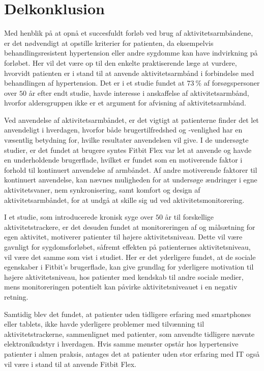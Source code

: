 \section{Delkonklusion}

Med henblik på at opnå et succesfuldt forløb ved brug af aktivitetsarmbåndene, er det nødvendigt at opstille kriterier for patienten, da eksempelvis behandlingsresistent hypertension eller andre sygdomme kan have indvirkning på forløbet. Her vil det være op til den enkelte praktiserende læge at vurdere, hvorvidt patienten er i stand til at anvende aktivitetsarmbånd i forbindelse med behandlingen af hypertension. Det er i et studie fundet at $73~\%$ af forsøgspersoner over $50$ år efter endt studie, havde interesse i anskaffelse af aktivitetsarmbånd, hvorfor aldersgruppen ikke er et argument for afvisning af aktivitetsarmbånd.

Ved anvendelse af aktivitetsarmbåndet, er det vigtigt at patienterne finder det let anvendeligt i hverdagen, hvorfor både brugertilfredshed og -venlighed har en væsentlig betydning for, hvilke resultater anvendelsen vil give. I de undersøgte studier, er det fundet at brugere syntes Fitbit Flex var let at anvende og havde en underholdende brugerflade, hvilket er fundet som en motiverende faktor i forhold til kontinuert anvendelse af armbåndet. Af andre motiverende faktorer til kontinuert anvendelse, kan nævnes muligheden for at undersøge ændringer i egne aktivitetsvaner, nem synkronisering, samt komfort og design af aktivitetsarmbåndet, for at undgå at skille sig ud ved aktivitetsmonitorering.

I et studie, som introducerede kronisk syge over $50$ år til forskellige aktivitetstrackere, er det desuden fundet at monitoreringen af og målsætning for egen aktivitet, motiverer patienter til højere aktivitetsniveau. Dette vil være gavnligt for sygdomsforløbet, såfremt effekten på patienternes aktivitetsniveau, vil være det samme som vist i studiet. Her er det yderligere fundet, at de sociale egenskaber i Fitbit's brugerflade, kan give grundlag for yderligere motivation til højere aktivitetsniveau, hos patienter med kendskab til andre sociale medier, mens monitoreringen potentielt kan påvirke aktivitetsniveauet i en negativ retning.

Samtidig blev det fundet, at patienter uden tidligere erfaring med smartphones eller tablets, ikke havde yderligere problemer med tilvænning til aktivitetstrackerne, sammenlignet med patienter, som anvendte tidligere nævnte elektronikudstyr i hverdagen. Hvis samme mønster opstår hos hypertensive patienter i almen praksis, antages det at patienter uden stor erfaring med IT også vil være i stand til at anvende Fitbit Flex. 

